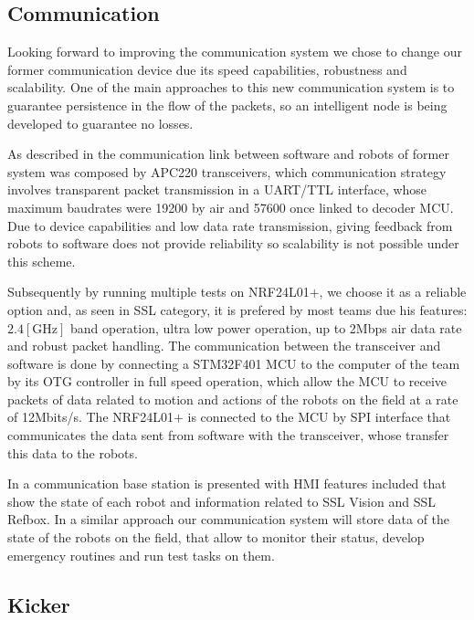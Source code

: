 \documentclass{llncs}
\newcommand{\RK}[1]{{\textcolor{blue}{[Rk3: #1]}}}  %
\begin{document}
\subsection{Communication}
Looking forward to improving the communication system we chose to change our former communication device due its speed capabilities, robustness and scalability. One of the main approaches to this new communication system is to guarantee persistence in the flow of the packets, so an intelligent node is being developed to guarantee no losses.

As described in \cite{ais2018tdp} the communication link between software and robots of former system was composed by APC220 transceivers, which communication strategy involves transparent packet transmission in a UART/TTL interface, whose maximum baudrates were 19200 by air and 57600 once linked to decoder MCU. Due to device capabilities and low data rate transmission, giving feedback from robots to software does not provide reliability so scalability is not possible under this scheme.

Subsequently by running multiple tests on NRF24L01$+$, we choose it as a reliable option and, as seen in SSL category, it is prefered by most teams due his features: $2.4[\text{GHz}]$ band operation, ultra low power operation, up to 2Mbps air data rate and robust packet handling. The communication between the transceiver and software is done by connecting a STM32F401 MCU to the computer of the team by its OTG controller in full speed operation, which allow the MCU to receive packets of data related to motion and actions of the robots on the field at a rate of 12Mbits/s. The NRF24L01$+$ is connected to the MCU by SPI interface that communicates the data sent from software with the transceiver, whose transfer this data to the robots.

In \cite{tigers2018etdp} a communication base station is presented with HMI features included that show the state of each robot and information related to SSL Vision and SSL Refbox. In a similar approach our communication system will store data of the state of the robots on the field, that allow to monitor their status, develop emergency routines and run test tasks on them.


\subsection{Kicker}
\end{document}
